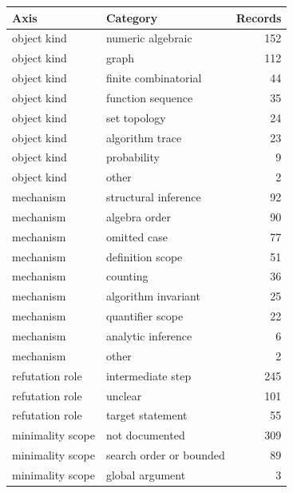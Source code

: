 \begin{tabular}{llr}
\toprule
Axis & Category & Records \\
\midrule
object kind & numeric algebraic & 152 \\
object kind & graph & 112 \\
object kind & finite combinatorial & 44 \\
object kind & function sequence & 35 \\
object kind & set topology & 24 \\
object kind & algorithm trace & 23 \\
object kind & probability & 9 \\
object kind & other & 2 \\
\midrule
mechanism & structural inference & 92 \\
mechanism & algebra order & 90 \\
mechanism & omitted case & 77 \\
mechanism & definition scope & 51 \\
mechanism & counting & 36 \\
mechanism & algorithm invariant & 25 \\
mechanism & quantifier scope & 22 \\
mechanism & analytic inference & 6 \\
mechanism & other & 2 \\
\midrule
refutation role & intermediate step & 245 \\
refutation role & unclear & 101 \\
refutation role & target statement & 55 \\
\midrule
minimality scope & not documented & 309 \\
minimality scope & search order or bounded & 89 \\
minimality scope & global argument & 3 \\
\bottomrule
\end{tabular}
